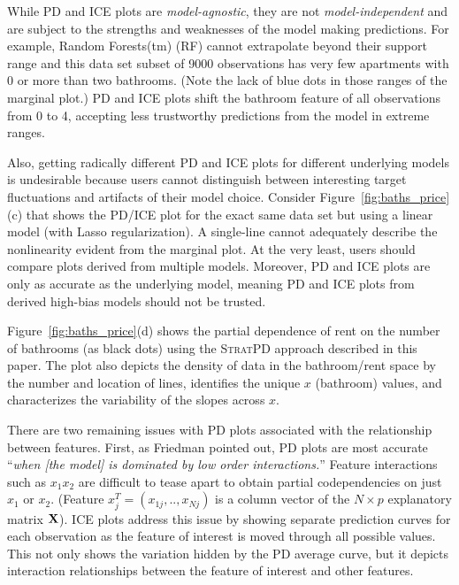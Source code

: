 \documentclass[12pt]{article}
\newcommand{\figref}[1]{Figure~\ref{#1}}
\newcommand{\cut}[1]{}
\newcommand{\spd}{\fontfamily{cmr}\textsc{\small StratPD}}
\begin{document}
\cut{The partial dependence plot broadly follows the marginal plot except for the prices of two and three bathroom apartments, where it levels off. This is counterintuitive and exposes an issue with PD and ICE plots.} While PD and ICE plots are {\em model-agnostic}, they are not {\em model-independent} and are subject to the strengths and weaknesses of the model making predictions.  For example, Random Forests(tm) (RF) cannot extrapolate beyond their support range and this data set subset of 9000 observations has very few apartments with 0 or more than two bathrooms.  (Note the lack of blue dots in those ranges of the marginal plot.) PD and ICE plots shift the bathroom feature of all observations from 0 to 4, accepting less trustworthy predictions from the model in extreme ranges.   

Also, getting radically different PD and ICE plots for different underlying models is undesirable because users cannot distinguish between interesting target fluctuations and artifacts of their model choice. Consider \figref{fig:baths_price}(c) that shows the PD/ICE plot for the exact same data set but using a linear model (with Lasso regularization). A single-line cannot adequately describe the nonlinearity evident from the marginal plot. At the very least, users should compare plots derived from multiple models. Moreover, PD and ICE plots are only as accurate as the underlying model, meaning PD and ICE plots from derived high-bias models should not be trusted.

\figref{fig:baths_price}(d) shows the partial dependence of rent on the number of bathrooms (as black dots) using the \spd{} approach described in this paper. The plot also depicts the density of data in the bathroom/rent space by the number and location of lines, identifies the unique $x$ (bathroom) values, and characterizes the variability of the slopes across $x$.

There are two remaining issues with PD plots associated with the relationship between features. First, as Friedman pointed out, PD plots are most accurate ``{\em when {\em [the model]} is dominated by low order interactions.}''  Feature interactions such as $x_1x_2$ are difficult to tease apart to obtain partial codependencies on just $x_1$ or $x_2$. (Feature $x_j^T = (x_{1j}, .., x_{Nj})$ is a column vector of the  $N \times p$ explanatory matrix ${\bf X}$). ICE plots address this issue by showing separate prediction curves for each observation as the feature of interest is moved through all possible values.  This not only shows the variation hidden by the PD average curve, but it depicts interaction relationships between the feature of interest and other features.
\end{document}
